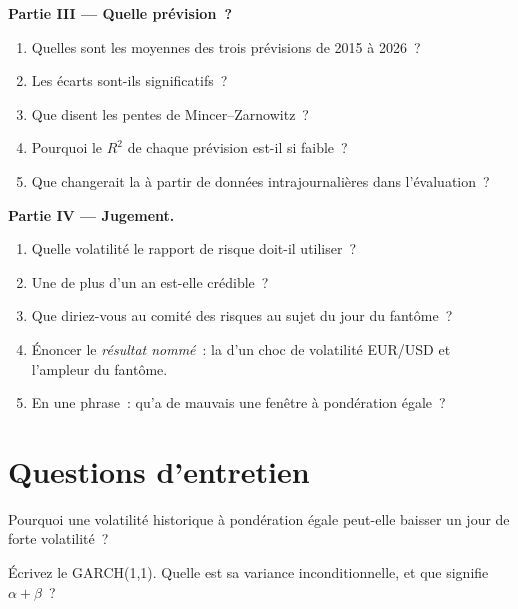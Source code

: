 \begin{problem}
\medskip\noindent\textbf{Partie III --- Quelle prévision~?}
\begin{enumerate}[resume]
\item Quelles sont les  moyennes des trois prévisions de 2015 à 2026~?
\item Les écarts sont-ils significatifs~?
\item Que disent les pentes de Mincer--Zarnowitz~?
\item Pourquoi le $R^2$ de chaque prévision est-il si faible~?
\item Que changerait la  à partir de données intrajournalières dans l'évaluation~?
\end{enumerate}

\medskip\noindent\textbf{Partie IV --- Jugement.}
\begin{enumerate}[resume]
\item Quelle volatilité le rapport de risque doit-il utiliser~?
\item Une  de plus d'un an est-elle crédible~?
\item Que diriez-vous au comité des risques au sujet du jour du fantôme~?
\item Énoncer le \emph{résultat nommé}~: la  d'un choc de volatilité EUR/USD et l'ampleur du fantôme.
\item En une phrase~: qu'a de mauvais une fenêtre à pondération égale~?
\end{enumerate}
\end{problem}

\section{Questions d'entretien}

\begin{interviewq}\label{iq:qm:volatility-models:1}
Pourquoi une volatilité historique à pondération égale peut-elle baisser un jour de forte volatilité~?
\end{interviewq}

\begin{interviewq}\label{iq:qm:volatility-models:2}
Écrivez le GARCH(1,1). Quelle est sa variance inconditionnelle, et que signifie $\alpha + \beta$~?
\end{interviewq}

